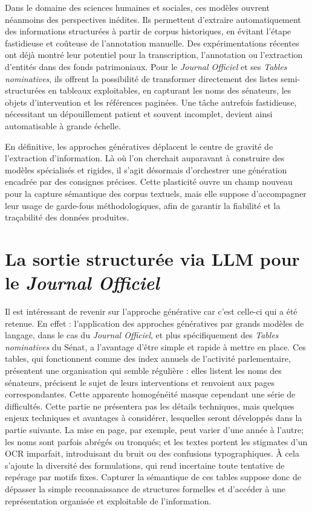 Dans le domaine des sciences humaines et sociales, ces modèles ouvrent néanmoins des perspectives inédites. Ils permettent d’extraire automatiquement des informations structurées à partir de corpus historiques, en évitant l’étape fastidieuse et coûteuse de l’annotation manuelle. Des expérimentations récentes ont déjà montré leur potentiel pour la transcription, l’annotation ou l’extraction d’entités dans des fonds patrimoniaux. Pour le \emph{Journal Officiel} et ses \emph{Tables nominatives}, ils offrent la possibilité de transformer directement des listes semi-structurées en tableaux exploitables, en capturant les noms des sénateurs, les objets d’intervention et les références paginées. Une tâche autrefois fastidieuse, nécessitant un dépouillement patient et souvent incomplet, devient ainsi automatisable à grande échelle.

En définitive, les approches génératives déplacent le centre de gravité de l’extraction d’information. Là où l’on cherchait auparavant à construire des modèles spécialisés et rigides, il s’agit désormais d’orchestrer une génération encadrée par des consignes précises. Cette plasticité ouvre un champ nouveau pour la capture sémantique des corpus textuels, mais elle suppose d’accompagner leur usage de garde-fous méthodologiques, afin de garantir la fiabilité et la traçabilité des données produites.

\section{La sortie structurée via LLM pour le \emph{Journal Officiel}}

Il est intéressant de revenir sur l'approche générative car c'est celle-ci qui a été retenue. En effet : l’application des approches génératives par grands modèles de langage, dans le cas du \emph{Journal Officiel}, et plus spécifiquement des \emph{Tables nominatives} du Sénat, a l'avantage d'être simple et rapide à mettre en place. Ces tables, qui fonctionnent comme des index annuels de l’activité parlementaire, présentent une organisation qui semble régulière : elles listent les noms des sénateurs, précisent le sujet de leurs interventions et renvoient aux pages correspondantes. Cette apparente homogénéité masque cependant une série de difficultés. Cette partie ne présentera pas les détails techniques, mais quelques enjeux techniques et avantages à considérer, lesquelles seront développés dans la partie suivante. La mise en page, par exemple, peut varier d’une année à l’autre; les noms sont parfois abrégés ou tronqués; et les textes portent les stigmates d’un OCR imparfait, introduisant du bruit ou des confusions typographiques. À cela s’ajoute la diversité des formulations, qui rend incertaine toute tentative de repérage par motifs fixes. Capturer la sémantique de ces tables suppose donc de dépasser la simple reconnaissance de structures formelles et d’accéder à une représentation organisée et exploitable de l’information.

